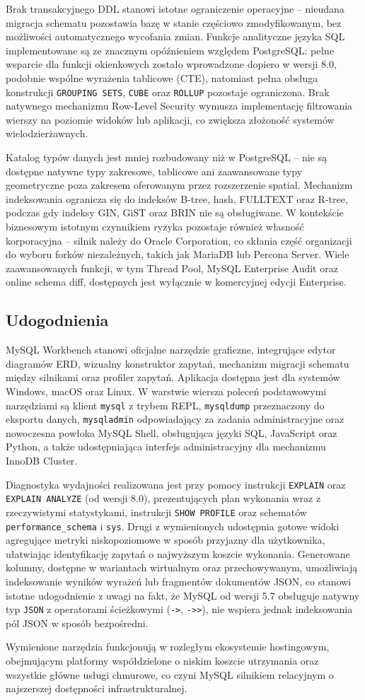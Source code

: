 Brak transakcyjnego DDL stanowi istotne ograniczenie operacyjne -- nieudana
migracja schematu pozostawia bazę w stanie częściowo zmodyfikowanym, bez
możliwości automatycznego wycofania zmian. Funkcje analityczne języka SQL
implementowane są ze znacznym opóźnieniem względem PostgreSQL: pełne wsparcie
dla funkcji okienkowych zostało wprowadzone dopiero w wersji 8.0, podobnie
wspólne wyrażenia tablicowe (CTE), natomiast pełna obsługa konstrukcji
\texttt{GROUPING SETS}, \texttt{CUBE} oraz \texttt{ROLLUP} pozostaje
ograniczona. Brak natywnego mechanizmu Row-Level Security wymusza
implementację filtrowania wierszy na poziomie widoków lub aplikacji, co
zwiększa złożoność systemów wielodzierżawnych.

Katalog typów danych jest mniej rozbudowany niż w PostgreSQL -- nie są
dostępne natywne typy zakresowe, tablicowe ani zaawansowane typy geometryczne
poza zakresem oferowanym przez rozszerzenie spatial. Mechanizm indeksowania
ogranicza się do indeksów B-tree, hash, FULLTEXT oraz R-tree, podczas gdy
indeksy GIN, GiST oraz BRIN nie są obsługiwane. W kontekście biznesowym
istotnym czynnikiem ryzyka pozostaje również własność korporacyjna -- silnik
należy do Oracle Corporation, co skłania część organizacji do wyboru forków
niezależnych, takich jak MariaDB lub Percona Server. Wiele zaawansowanych
funkcji, w tym Thread Pool, MySQL Enterprise Audit oraz online schema diff,
dostępnych jest wyłącznie w komercyjnej edycji Enterprise.

\subsection{Udogodnienia}

MySQL Workbench stanowi oficjalne narzędzie graficzne, integrujące edytor
diagramów ERD, wizualny konstruktor zapytań, mechanizm migracji schematu
między silnikami oraz profiler zapytań. Aplikacja dostępna jest dla systemów
Windows, macOS oraz Linux. W warstwie wiersza poleceń podstawowymi narzędziami
są klient \texttt{mysql} z trybem REPL, \texttt{mysqldump} przeznaczony do
eksportu danych, \texttt{mysqladmin} odpowiadający za zadania administracyjne
oraz nowoczesna powłoka MySQL Shell, obsługująca języki SQL, JavaScript oraz
Python, a także udostępniająca interfejs administracyjny dla mechanizmu
InnoDB Cluster.

Diagnostyka wydajności realizowana jest przy pomocy instrukcji \texttt{EXPLAIN}
oraz \texttt{EXPLAIN ANALYZE} (od wersji 8.0), prezentujących plan wykonania
wraz z rzeczywistymi statystykami, instrukcji \texttt{SHOW PROFILE} oraz
schematów \texttt{performance\_schema} i \texttt{sys}. Drugi z wymienionych
udostępnia gotowe widoki agregujące metryki niskopoziomowe w sposób przyjazny
dla użytkownika, ułatwiając identyfikację zapytań o najwyższym koszcie
wykonania. Generowane kolumny, dostępne w wariantach wirtualnym oraz
przechowywanym, umożliwiają indeksowanie wyników wyrażeń lub fragmentów
dokumentów JSON, co stanowi istotne udogodnienie z uwagi na fakt, że MySQL
od wersji 5.7 obsługuje natywny typ \texttt{JSON} z operatorami ścieżkowymi
(\texttt{->}, \texttt{->>}), nie wspiera jednak indeksowania pól JSON
w sposób bezpośredni.

Wymienione narzędzia funkcjonują w rozległym ekosystemie hostingowym,
obejmującym platformy współdzielone o niskim koszcie utrzymania oraz wszystkie
główne usługi chmurowe, co czyni MySQL silnikiem relacyjnym o najszerszej
dostępności infrastrukturalnej.
